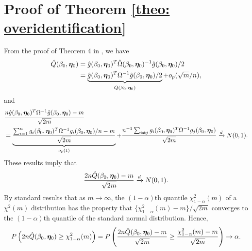 \documentclass[12pt]{article}
\begin{document}
{\section{Proof of Theorem \ref{theo: overidentification}}



From the proof of Theorem 4 in \cite{Newey:2009aa}, we have
\begin{align*}
	\hat Q (\beta_0, \bm \eta_0 ) &  =\hat{g}({ \beta}_0, {\bm \eta}_0 )^T \hat{\Omega} ({ \beta}_0, {\bm \eta}_0 )^{-1} \hat{g}({ \beta}_0,{\bm \eta}_0 )/2 \\
	& = \underbrace{\hat{g}({ \beta}_0, {\bm \eta}_0 )^T {\Omega}^{-1} \hat{g}({ \beta}_0,{\bm \eta}_0 )/2}_{	\tilde Q (\beta_0, \bm \eta_0 )  } + o_p(\sqrt{m}/n)  ,
\end{align*}
and 
\begin{align*}
&	\frac{ n  \hat{g}({ \beta}_0, {\bm \eta}_0 )^T {\Omega}^{-1} \hat{g}({ \beta}_0,{\bm \eta}_0 ) - m  }{\sqrt{2m}}\\
& = \underbrace{	\frac{ \sum_{i=1}^n  {g}_i ({ \beta}_0, {\bm \eta}_0 )^T {\Omega}^{-1} {g}_i ({ \beta}_0, {\bm \eta}_0 )/n - m  }{\sqrt{2m}} }_{o_p(1)}+ 	\frac{ n^{-1} \sum_{i\neq j }  {g}_i ({ \beta}_0, {\bm \eta}_0 )^T {\Omega}^{-1} {g}_j ({ \beta}_0, {\bm \eta}_0 ) }{\sqrt{2m}}  \xrightarrow{d} N(0,1) .
\end{align*}
These results imply that 
\begin{align*}
	\frac{2n \hat Q (\beta_0, \bm \eta_0 )  - m }{\sqrt{2m}} \xrightarrow{d} N(0,1) .
\end{align*}
By standard results that as $m\rightarrow\infty$, the $(1-\alpha)$th quantile $\chi_{1-\alpha}^2(m)$ of a $\chi^2(m)$ distribution has the property that $ \{ \chi_{1-\alpha}^2(m) - m \} / \sqrt{2m}$ converges to the $(1-\alpha)$th quantile of the standard normal distribution. Hence, 
\begin{align*}
	P\left( 2n \hat Q (\beta_0, \bm \eta_0) \geq  \chi_{1-\alpha}^2(m) \right) = 	P\left( \frac{2n \hat Q (\beta_0, \bm \eta_0) - m }{\sqrt{2m}} \geq \frac{ \chi_{1-\alpha}^2(m) - m}{\sqrt{2m}} \right) \to \alpha  .
\end{align*}



}
\end{document}
